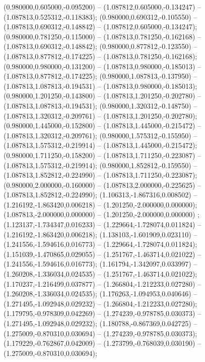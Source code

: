  (0.980000,0.605000,-0.095200) -- (1.087812,0.605000,-0.134247) -- (1.087813,0.525312,-0.118383);
 (0.980000,0.690312,-0.105550) -- (1.087813,0.690312,-0.148842) -- (1.087812,0.605000,-0.134247);
 (0.980000,0.781250,-0.115000) -- (1.087813,0.781250,-0.162168) -- (1.087813,0.690312,-0.148842);
 (0.980000,0.877812,-0.123550) -- (1.087813,0.877812,-0.174225) -- (1.087813,0.781250,-0.162168);
 (0.980000,0.980000,-0.131200) -- (1.087813,0.980000,-0.185013) -- (1.087813,0.877812,-0.174225);
 (0.980000,1.087813,-0.137950) -- (1.087813,1.087813,-0.194531) -- (1.087813,0.980000,-0.185013);
 (0.980000,1.201250,-0.143800) -- (1.087813,1.201250,-0.202780) -- (1.087813,1.087813,-0.194531);
 (0.980000,1.320312,-0.148750) -- (1.087813,1.320312,-0.209761) -- (1.087813,1.201250,-0.202780);
 (0.980000,1.445000,-0.152800) -- (1.087813,1.445000,-0.215472) -- (1.087813,1.320312,-0.209761);
 (0.980000,1.575312,-0.155950) -- (1.087813,1.575312,-0.219914) -- (1.087813,1.445000,-0.215472);
 (0.980000,1.711250,-0.158200) -- (1.087813,1.711250,-0.223087) -- (1.087813,1.575312,-0.219914);
 (0.980000,1.852812,-0.159550) -- (1.087813,1.852812,-0.224990) -- (1.087813,1.711250,-0.223087);
 (0.980000,2.000000,-0.160000) -- (1.087813,2.000000,-0.225625) -- (1.087813,1.852812,-0.224990);
 (1.106313,-1.867316,0.008502) -- (1.216192,-1.863420,0.006218) -- (1.201250,-2.000000,0.000000);
 (1.087813,-2.000000,0.000000) -- (1.201250,-2.000000,0.000000) ;
 (1.123137,-1.734347,0.016233) -- (1.229664,-1.728074,0.011824) -- (1.216192,-1.863420,0.006218);
 (1.138103,-1.601909,0.023110) -- (1.241556,-1.594616,0.016773) -- (1.229664,-1.728074,0.011824);
 (1.151039,-1.470865,0.029055) -- (1.251767,-1.463714,0.021022) -- (1.241556,-1.594616,0.016773);
 (1.161794,-1.342097,0.033997) -- (1.260208,-1.336034,0.024535) -- (1.251767,-1.463714,0.021022);
 (1.170237,-1.216499,0.037877) -- (1.266804,-1.212233,0.027280) -- (1.260208,-1.336034,0.024535);
 (1.176263,-1.094953,0.040646) -- (1.271495,-1.092948,0.029232) -- (1.266804,-1.212233,0.027280);
 (1.179795,-0.978309,0.042269) -- (1.274239,-0.978785,0.030373) -- (1.271495,-1.092948,0.029232);
 (1.180788,-0.867369,0.042725) -- (1.275009,-0.870310,0.030694) -- (1.274239,-0.978785,0.030373);
 (1.179229,-0.762867,0.042009) -- (1.273799,-0.768039,0.030190) -- (1.275009,-0.870310,0.030694);
